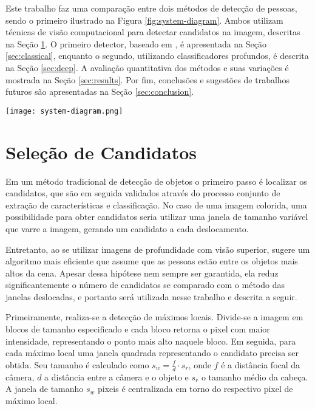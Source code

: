   Este trabalho faz uma comparação entre dois métodos de detecção de pessoas, sendo o primeiro ilustrado na Figura \ref{fig:system-diagram}. Ambos utilizam técnicas de visão computacional para detectar candidatos na imagem, descritas na Seção \ref{sec:candidates}. O primeiro detector, baseado em \cite{rauter}, é apresentada na Seção \ref{sec:classical}, enquanto o segundo, utilizando classificadores profundos, é descrita na Seção \ref{sec:deep}. A avaliação quantitativa dos métodos e suas variações é mostrada na Seção \ref{sec:results}. Por fim, conclusões e sugestões de trabalhos futuros são apresentadas na Seção \ref{sec:conclusion}.

  \begin{figure*}[!t]
  \centering
  \texttt{[image: system-diagram.png]}
  \caption{Diagrama do sistema de detecção de pessoas.}
  \label{fig:system-diagram}
  \end{figure*}

\section{Seleção de Candidatos}
\label{sec:candidates}

    Em um método tradicional de detecção de objetos \cite{traditional-objdetect} o primeiro passo é localizar os candidatos, que são em seguida validados através do processo conjunto de extração de características e classificação. No caso de uma imagem colorida, uma possibilidade para obter candidatos seria utilizar uma janela de tamanho variável que varre a imagem, gerando um candidato a cada deslocamento.

    Entretanto, ao se utilizar imagens de profundidade com visão superior, \cite{rauter} sugere um algoritmo mais eficiente que assume que as pessoas estão entre os objetos mais altos da cena. Apesar dessa hipótese nem sempre ser garantida, ela reduz significantemente o número de candidatos se comparado com o método das janelas deslocadas, e portanto será utilizada nesse trabalho e descrita a seguir.

    Primeiramente, realiza-se a detecção de máximos locais. Divide-se a imagem em blocos de tamanho especificado e cada bloco retorna o pixel com maior intensidade, representando o ponto mais alto naquele bloco. Em seguida, para cada máximo local uma janela quadrada representando o candidato precisa ser obtida. Seu tamanho é calculado como
      $s_w = \frac{f}{d} \cdot s_r$,
    onde $f$ é a distância focal da câmera, $d$ a distância entre a câmera e o objeto e $s_r$ o tamanho médio da cabeça. A janela de tamanho $s_w$ pixeis é centralizada em torno do respectivo pixel de máximo local.

